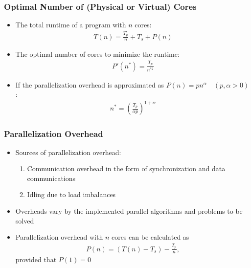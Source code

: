 \documentclass[xcolor=x11names,compress]{beamer}
\renewcommand{\(}{\begin{columns}}
\renewcommand{\)}{\end{columns}}
\newcommand{\<}[1]{\begin{column}{#1}}
\renewcommand{\>}{\end{column}}
\begin{document}
\begin{frame}
\frametitle{Optimal Number of (Physical or Virtual) Cores}
\begin{itemize}
\item The total runtime of a program with $n$ cores:
\begin{align*}
T(n) = \frac{T_p}{n} + T_s + P(n)
\end{align*}
\item The optimal number of cores to minimize the runtime:
\begin{align*}
P'(n^*) = \frac{T_p}{n^{*2}} 
\end{align*}
\item If the parallelization overhead is approximated as $P(n)=pn^\alpha \quad (p,\alpha>0)$:
\begin{align*}
n^* = \left(\frac{T_p}{\alpha p} \right)^{1+\alpha}
\end{align*}
\end{itemize}
\end{frame}


\begin{frame}
\frametitle{Parallelization Overhead}
\begin{itemize}
\item Sources of parallelization overhead:
\begin{enumerate}
\item Communication overhead in the form of synchronization and data communications
\item Idling due to load imbalances
\end{enumerate}
\item Overheads vary by the implemented parallel algorithms and problems to be solved 
\item Parallelization overhead with $n$ cores can be calculated as
\begin{align*}
P(n) = (T(n)-T_s) - \frac{T_p}{n},
\end{align*}
provided that $P(1)=0$
\end{itemize}
\end{frame}
\end{document}
